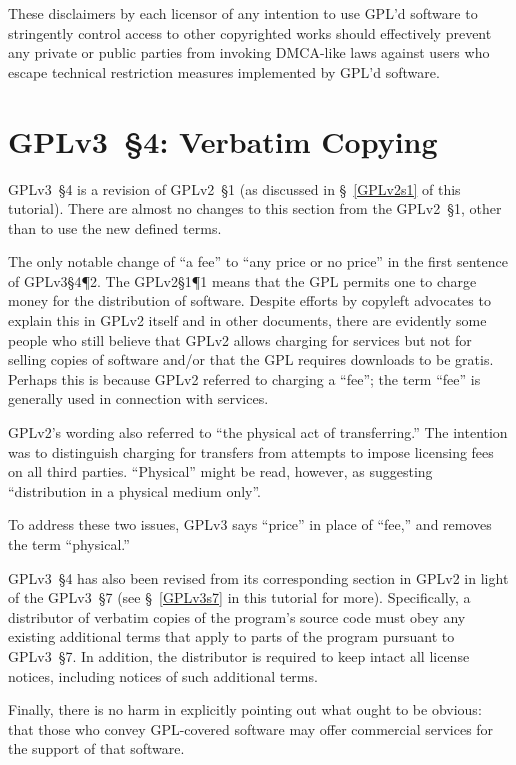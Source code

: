 These disclaimers by each licensor of any intention to use GPL'd software to
stringently control access to other copyrighted works should effectively
prevent any private or public parties from invoking DMCA-like laws against
users who escape technical restriction measures implemented by GPL'd
software.

\section{GPLv3~\S4: Verbatim Copying}
\label{GPLv3s4}

GPLv3~\S4 is a revision of GPLv2~\S1 (as discussed in \S~\ref{GPLv2s1} of
this tutorial).   There are almost no changes to this section from the
GPLv2~\S1, other than to use the new defined terms.

The only notable change of ``a fee'' to ``any price or no price'' in the
first sentence of GPLv3\S4\P2.  The GPLv2\S1\P1 means that the GPL permits
one to charge money for the distribution of software.  Despite efforts by
copyleft advocates to explain this in GPLv2 itself and in other documents,
there are evidently some people who still believe that GPLv2 allows charging
for services but not for selling copies of software and/or that the GPL
requires downloads to be gratis.  Perhaps this is because GPLv2 referred to
charging a ``fee''; the term ``fee'' is generally used in connection with
services.

GPLv2's wording also referred to ``the physical act of transferring.''  The
intention was to distinguish charging for transfers from attempts to impose
licensing fees on all third parties.  ``Physical'' might be read, however, as
suggesting ``distribution in a physical medium only''.

To address these two issues, GPLv3 says ``price'' in place of ``fee,'' and
removes the term ``physical.''

GPLv3~\S4 has also been revised from its corresponding section in GPLv2 in
light of the GPLv3~\S7 (see \S~\ref{GPLv3s7} in this tutorial for more).
Specifically, a distributor of verbatim copies of the program's source code
must obey any existing additional terms that apply to parts of the program
pursuant to GPLv3~\S7.  In addition, the distributor is required to keep
intact all license notices, including notices of such additional terms.

Finally, there is no harm in explicitly pointing out what ought to be
obvious: that those who convey GPL-covered software may offer commercial
services for the support of that software.

